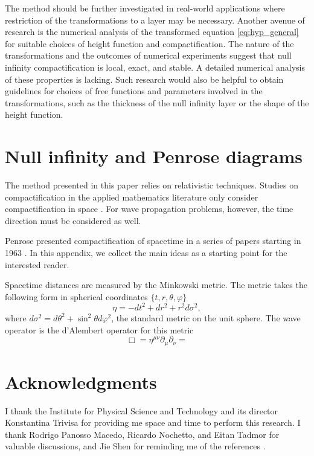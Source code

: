 \documentclass[final,onefignum,onetabnum]{siamart190516}
\begin{document}
The method should be further investigated in real-world applications where restriction of the transformations to a layer may be necessary. Another avenue of research is the numerical analysis of the transformed equation \eqref{eq:hyp_general} for suitable choices of height function and compactification. The nature of the transformations and the outcomes of numerical experiments suggest that null infinity compactification is local, exact, and stable. A detailed numerical analysis of these properties is lacking. Such research would also be helpful to obtain guidelines for choices of free functions and parameters involved in the transformations, such as the thickness of the null infinity layer or the shape of the height function.

\appendix
\section{Null infinity and Penrose diagrams}
The method presented in this paper relies on relativistic techniques. Studies on compactification in the applied mathematics literature only consider compactification in space \cite{GroschOrszag77, boyd1982optimization, shen2009some}. For wave propagation problems, however, the time direction must be considered as well. 

Penrose presented compactification of spacetime in a series of papers starting in 1963 \cite{Penrose, Penrose65}. In this appendix, we collect the main ideas as a starting point for the interested reader. 

Spacetime distances are measured by the Minkowski metric. The metric takes the following form in spherical coordinates $\{t,r,\theta,\varphi\}$
\[ \eta  = -dt^2 + dr^2  + r^2 d\sigma^2, \]
where $d\sigma^2 = d\theta^2 + \sin^2\theta d\varphi^2$, the standard metric on the unit sphere. The wave operator is the d'Alembert operator for this metric
\[ \Box = \eta^{\mu\nu} \partial_\mu \partial_\nu =  \]

\section*{Acknowledgments}
I thank the Institute for Physical Science and Technology and its director Konstantina Trivisa for providing me space and time to perform this research. I thank Rodrigo Panosso Macedo, Ricardo Nochetto, and Eitan Tadmor for valuable discussions, and Jie Shen for reminding me of the references \cite{wang2017perfect, yang2021truly}. 



%


\end{document}
